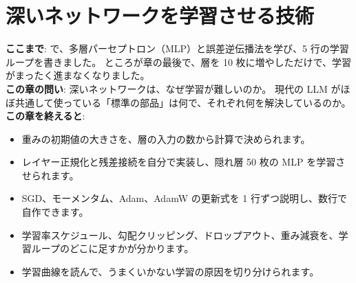 \chapter{深いネットワークを学習させる技術}\label{ch:training}


\begin{chapterlead}
\textbf{ここまで}: で、多層パーセプトロン（MLP）と誤差逆伝播法を学び、5 行の学習ループを書きました。
ところが章の最後で、層を 10 枚に増やしただけで、学習がまったく進まなくなりました。\\[1mm]
\textbf{この章の問い}: 深いネットワークは、なぜ学習が難しいのか。
現代の LLM がほぼ共通して使っている「標準の部品」は何で、それぞれ何を解決しているのか。\\[1mm]
\textbf{この章を終えると}:
\begin{itemize}
\item 重みの初期値の大きさを、層の入力の数から計算で決められます。
\item レイヤー正規化と残差接続を自分で実装し、隠れ層 50 枚の MLP を学習させられます。
\item SGD、モーメンタム、Adam、AdamW の更新式を 1 行ずつ説明し、数行で自作できます。
\item 学習率スケジュール、勾配クリッピング、ドロップアウト、重み減衰を、学習ループのどこに足すかが分かります。
\item 学習曲線を読んで、うまくいかない学習の原因を切り分けられます。
\end{itemize}
\end{chapterlead}

